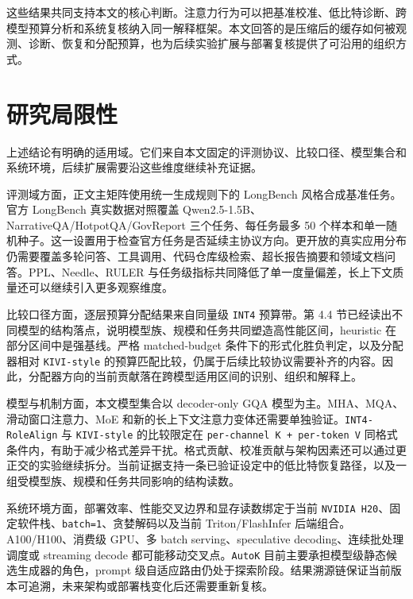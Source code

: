 这些结果共同支持本文的核心判断。注意力行为可以把基准校准、低比特诊断、跨模型预算分析和系统复核纳入同一解释框架。本文回答的是压缩后的缓存如何被观测、诊断、恢复和分配预算，也为后续实验扩展与部署复核提供了可沿用的组织方式。

\section{研究局限性}
\label{sec:conclusion-limitations}

上述结论有明确的适用域。它们来自本文固定的评测协议、比较口径、模型集合和系统环境，后续扩展需要沿这些维度继续补充证据。

评测域方面，正文主矩阵使用统一生成规则下的 LongBench 风格合成基准任务。官方 LongBench 真实数据对照覆盖 Qwen2.5-1.5B、NarrativeQA/HotpotQA/GovReport 三个任务、每任务最多 50 个样本和单一随机种子。这一设置用于检查官方任务是否延续主协议方向。更开放的真实应用分布仍需要覆盖多轮问答、工具调用、代码仓库级检索、超长报告摘要和领域文档问答。PPL、Needle、RULER 与任务级指标共同降低了单一度量偏差，长上下文质量还可以继续引入更多观察维度。

比较口径方面，逐层预算分配结果来自同量级 \texttt{INT4} 预算带。第 4.4 节已经读出不同模型的结构落点，说明模型族、规模和任务共同塑造高性能区间，heuristic 在部分区间中是强基线。严格 matched-budget 条件下的形式化胜负判定，以及分配器相对 \texttt{KIVI-style} 的预算匹配比较，仍属于后续比较协议需要补齐的内容。因此，分配器方向的当前贡献落在跨模型适用区间的识别、组织和解释上。

模型与机制方面，本文模型集合以 decoder-only GQA 模型为主。MHA、MQA、滑动窗口注意力、MoE 和新的长上下文注意力变体还需要单独验证。\texttt{INT4-RoleAlign} 与 \texttt{KIVI-style} 的比较限定在 \texttt{per-channel K + per-token V} 同格式条件内，有助于减少格式差异干扰。格式贡献、校准贡献与架构因素还可以通过更正交的实验继续拆分。当前证据支持一条已验证设定中的低比特恢复路径，以及一组受模型族、规模和任务共同影响的结构读数。

系统环境方面，部署效率、性能交叉边界和显存读数绑定于当前 \texttt{NVIDIA H20}、固定软件栈、\texttt{batch=1}、贪婪解码以及当前 Triton/FlashInfer 后端组合。A100/H100、消费级 GPU、多 batch serving、speculative decoding、连续批处理调度或 streaming decode 都可能移动交叉点。\texttt{AutoK} 目前主要承担模型级静态候选生成器的角色，prompt 级自适应路由仍处于探索阶段。结果溯源链保证当前版本可追溯，未来架构或部署栈变化后还需要重新复核。


